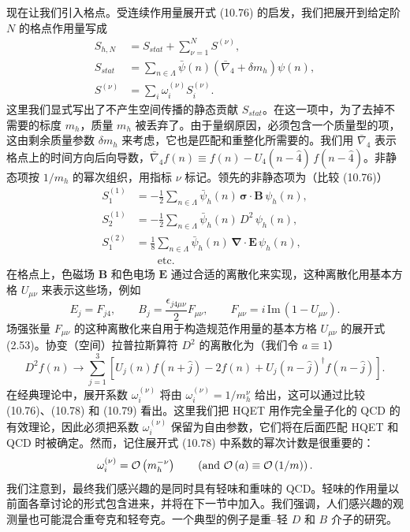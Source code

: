 现在让我们引入格点。受连续作用量展开式 (10.76) 的启发，我们把展开到给定阶 $N$ 的格点作用量写成
\begin{equation}
  \begin{split}
    S_{h,N} &= S_{stat} + \sum_{\nu=1}^{N}S^{(\nu)} , \\
    S_{stat} &= \sum_{n\in\Lambda}
    \bar\psi(n)\left(\bar\nabla_4 + \delta m_h\right)\psi(n) , \\
    S^{(\nu)} &= \sum_i \omega_i^{(\nu)} S_i^{(\nu)} .
  \end{split}
\end{equation}
这里我们显式写出了不产生空间传播的静态贡献 $S_{stat}$。在这一项中，为了去掉不需要的标度 $m_h$，质量 $m_h$ 被丢弃了。由于量纲原因，必须包含一个质量型的项，这由剩余质量参数 $\delta m_h$ 来考虑，它也是匹配和重整化所需要的。我们用 $\bar\nabla_4$ 表示格点上的时间方向后向导数，$\bar\nabla_4 f(n) \equiv f(n) - U_4(n-\hat 4)\,f(n-\hat 4)$。非静态项按 $1/m_h$ 的幂次组织，用指标 $\nu$ 标记。领先的非静态项为（比较 (10.76)）
\begin{equation}
  \begin{split}
    S_1^{(1)} &= -\frac{1}{2}\sum_{n\in\Lambda}
    \bar\psi_h(n)\,\boldsymbol{\sigma}\cdot\boldsymbol{B}\,\psi_h(n) , \\
    S_2^{(1)} &= -\frac{1}{2}\sum_{n\in\Lambda}
    \bar\psi_h(n)\,D^2\,\psi_h(n) , \\
    S_1^{(2)} &= \frac{1}{8}\sum_{n\in\Lambda}
    \bar\psi_h(n)\,\boldsymbol{\nabla}\cdot\boldsymbol{E}\,\psi_h(n) , \\
    &\qquad \text{etc.}
  \end{split}
\end{equation}
在格点上，色磁场 $\boldsymbol{B}$ 和色电场 $\boldsymbol{E}$ 通过合适的离散化来实现，这种离散化用基本方格 $U_{\mu\nu}$ 来表示这些场，例如
\begin{equation}
  E_j = F_{j4} , \qquad B_j = \frac{\epsilon_{j4\mu\nu}}{2}F_{\mu\nu} , \qquad
  F_{\mu\nu} = i\,\mathrm{Im}\,(1 - U_{\mu\nu}) .
\end{equation}
场强张量 $F_{\mu\nu}$ 的这种离散化来自用于构造规范作用量的基本方格 $U_{\mu\nu}$ 的展开式 (2.53)。协变（空间）拉普拉斯算符 $D^2$ 的离散化为（我们令 $a \equiv 1$）
\begin{equation}
  D^2 f(n) \longrightarrow
  \sum_{j=1}^{3}\left[U_j(n)f(n+\hat j) - 2f(n)
  + U_j(n-\hat j)^{\dagger}f(n-\hat j)\right] .
\end{equation}
在经典理论中，展开系数 $\omega_i^{(\nu)}$ 将由 $\omega_i^{(\nu)} = 1/m_h^{\nu}$ 给出，这可以通过比较 (10.76)、(10.78) 和 (10.79) 看出。这里我们把 HQET 用作完全量子化的 QCD 的有效理论，因此必须把系数 $\omega_i^{(\nu)}$ 保留为自由参数，它们将在后面匹配 HQET 和 QCD 时被确定。然而，记住展开式 (10.78) 中系数的幂次计数是很重要的：
\begin{equation}
  \omega_i^{(\nu)} = \mathcal{O}\left(m_h^{-\nu}\right)
  \qquad \left(\text{and } \mathcal{O}\left(a\right) \equiv \mathcal{O}\left(1/m\right)\right) .
\end{equation}
我们注意到，最终我们感兴趣的是同时具有轻味和重味的 QCD。轻味的作用量以前面各章讨论的形式包含进来，并将在下一节中加入。我们强调，人们感兴趣的观测量也可能混合重夸克和轻夸克。一个典型的例子是重--轻 $D$ 和 $B$ 介子的研究。

